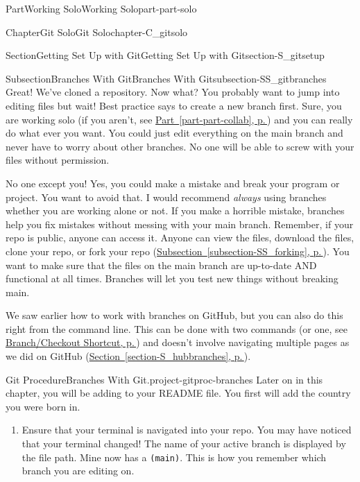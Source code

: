 \documentclass[twoside,10pt,]{book}
\newcommand{\xreffont}{\relax}
\newcommand{\mono}[1]{\texttt{#1}}
\begin{document}
\begin{partptx}{Part}{Working Solo}{}{Working Solo}{}{}{part-part-solo}
\begin{chapterptx}{Chapter}{Git Solo}{}{Git Solo}{}{}{chapter-C_gitsolo}
\begin{sectionptx}{Section}{Getting Set Up with Git}{}{Getting Set Up with Git}{}{}{section-S_gitsetup}
\typeout{************************************************}
%
\begin{subsectionptx}{Subsection}{Branches With Git}{}{Branches With Git}{}{}{subsection-SS_gitbranches}
%
%
Great! We've cloned a repository. Now what? You probably want to jump into editing files but wait! Best practice says to create a new branch first. Sure, you are working solo (if you aren't, see \hyperref[part-part-collab]{Part~{\xreffont\ref{part-part-collab}}, p.\,\pageref{part-part-collab}}) and you can really do what ever you want. You could just edit everything on the main branch and never have to worry about other branches. No one will be able to screw with your files without permission.%
\par
No one except you! Yes, you could make a mistake and break your program or project. You want to avoid that. I would recommend \emph{always} using branches whether you are working alone or not. If you make a horrible mistake, branches help you fix mistakes without messing with your main branch. Remember, if your repo is public, anyone can access it. Anyone can view the files, download the files, clone your repo, or fork your repo (\hyperref[subsection-SS_forking]{Subsection~{\xreffont\ref{subsection-SS_forking}}, p.\,\pageref{subsection-SS_forking}}). You want to make sure that the files on the main branch are up-to-date AND functional at all times. Branches will let you test new things without breaking main.%
\par
We saw earlier how to work with branches on GitHub, but you can also do this right from the command line. This can be done with two commands (or one, see \hyperlink{paragraphs-branch-shortcut}{Branch\slash{}Checkout Shortcut, p.\,\pageref{paragraphs-branch-shortcut}}) and doesn't involve navigating multiple pages as we did on GitHub (\hyperref[section-S_hubbranches]{Section~{\xreffont\ref{section-S_hubbranches}}, p.\,\pageref{section-S_hubbranches}}).%
\begin{project}{Git Procedure}{Branches With Git.}{project-gitproc-branches}%
%
%
%
Later on in this chapter, you will be adding to your README file. You first will add the country you were born in.%
\begin{enumerate}[font=\bfseries,label=(\alph*),ref=\alph*]%
\item{}Ensure that your terminal is navigated into your repo. You may have noticed that your terminal changed! The name of your active branch is displayed by the file path. Mine now has a \mono{(main)}. This is how you remember which branch you are editing on.%

\end{enumerate}
\end{project}
\end{subsectionptx}
\end{sectionptx}
\end{chapterptx}
\end{partptx}
\end{document}

